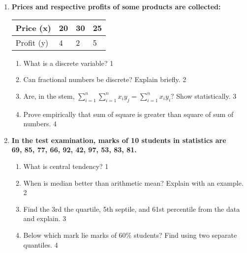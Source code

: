 \documentclass{article}
\begin{document}
\begin{enumerate}
  \item
  \textbf{Prices and respective profits of some products are collected:}
 

\begin{table}[h]
 \begin{center}
\begin{tabular}{l|l|l|l}

Price (x)  & 20 & 30 & 25 \\ \hline
Profit (y) & 4  & 2  & 5  \\ 
\end{tabular}
\end{center}
\end{table}


  \begin{enumerate}
    \item
	What is a discrete variable? \hfill 1
    \item
    	Can fractional numbers be discrete? Explain briefly.  \hfill 2
    \item
    	Are, in the stem, $\displaystyle \sum_{i=1}^{n} \sum_{i=1}^{n} x_iy_j = \sum_{i=1}^{n} x_iy_i?$ Show statistically. \hfill 3
     \item
     	Prove empirically that sum of square is greater than square of sum of numbers. \hfill 4
  \end{enumerate}
  
    \item
  \textbf{In the test examination, marks of 10 students in statistics are \\ 69, 85, 77, 66, 92, 42, 97, 53, 83, 81.}
  \begin{enumerate}
    \item
	What is central tendency? \hfill 1
    \item
	When is median better than arithmetic mean? Explain with an example. \hfill 2
    \item  
	Find the 3rd the quartile, 5th septile, and 61st percentile from the data and explain.  \hfill 3
    \item
	Below which mark lie marks of 60\% students? Find using two separate quantiles. \hfill 4
\end{enumerate}


\end{enumerate}
\end{document}
